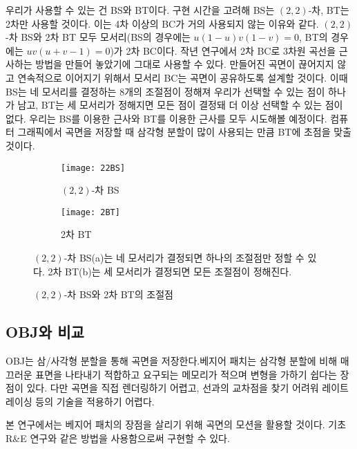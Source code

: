 \documentclass[10pt]{gshs-report-v2.0}
\theoremstyle{theorem}
\theoremstyle{lemma}
\theoremstyle{definition}
\begin{document}
우리가 사용할 수 있는 건 BS와 BT이다. 구현 시간을 고려해 BS는 $(2,2)$-차, BT는 2차만 사용할 것이다. 이는 4차 이상의 BC가 거의 사용되지 않는 이유와 같다. $(2,2)$-차 BS와 2차 BT 모두 모서리\footnotesize(BS의 경우에는 $u(1-u)v(1-v)=0$, BT의 경우에는 $uv(u+v-1)=0$)\normalsize 가 2차 BC이다. 작년 연구에서 2차 BC로 3차원 곡선을 근사하는 방법을 만들어 놓았기에 그대로 사용할 수 있다. 만들어진 곡면이 끊어지지 않고 연속적으로 이어지기 위해서 모서리 BC는 곡면이 공유하도록 설계할 것이다. 이때 BS는 네 모서리를 결정하는 8개의 조절점이 정해져 우리가 선택할 수 있는 점이 하나가 남고, BT는 세 모서리가 정해지면 모든 점이 결정돼 더 이상 선택할 수 있는 점이 없다. 우리는 BS를 이용한 근사와 BT를 이용한 근사를 모두 시도해볼 예정이다. 컴퓨터 그래픽에서 곡면을 저장할 때 삼각형 분할이 많이 사용되는 만큼 BT에 초점을 맞출 것이다.

\begin{figure}[h]
	\centering
	\begin{subfigure}{.45\textwidth}
		\centering
		\texttt{[image: 22BS]}
		\caption{$(2,2)$-차 BS}
	\end{subfigure}
	\hfill
	\begin{subfigure}{.45\textwidth}
		\centering
		\texttt{[image: 2BT]}
		\caption{2차 BT}
	\end{subfigure}
	\caption{$(2,2)$-차 BS와 2차 BT의 조절점}
	\small $(2,2)$-차 BS(a)는 네 모서리가 결정되면 하나의 조절점만 정할 수 있다. 2차 BT(b)는 세 모서리가 결정되면 모든 조절점이 정해진다. 
\end{figure}

\subsection{OBJ와 비교}
OBJ는 삼/사각형 분할을 통해 곡면을 저장한다.베지어 패치는 삼각형 분할에 비해 매끄러운 표면을 나타내기 적합하고 요구되는 메모리가 적으며 변형을 가하기 쉽다는 장점이 있다. 다만 곡면을 직접 렌더링하기 어렵고, 선과의 교차점을 찾기 어려워 레이트레이싱 등의 기술을 적용하기 어렵다. 

본 연구에서는 베지어 패치의 장점을 살리기 위해 곡면의 모션을 활용할 것이다. 기초 R\&E 연구와 같은 방법을 사용함으로써 구현할 수 있다.\cite{last year, motion}
\end{document}
